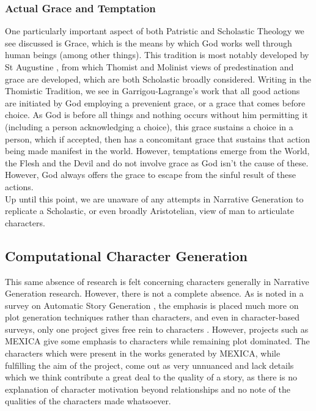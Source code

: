 \documentclass[11pt]{article}
\begin{document}
\subsubsection{Actual Grace and Temptation}
One particularly important aspect of both Patristic and Scholastic Theology we see discussed is Grace, which is the means by which God works well through human beings (among other things). This tradition is most notably developed by St Augustine \cite{hippo2014grace}, from which Thomist and Molinist views of predestination and grace are developed, which are both Scholastic broadly considered. Writing in the Thomistic Tradition, we see in Garrigou-Lagrange's work \cite{garrigou2013three} that all good actions are initiated by God employing a prevenient grace, or a grace that comes before choice. As God is before all things and nothing occurs without him permitting it (including a person acknowledging a choice), this grace sustains a choice in a person, which if accepted, then has a concomitant grace that sustains that action being made manifest in the world. However, temptations emerge from the World, the Flesh and the Devil and do not involve grace as God isn't the cause of these. However, God always offers the grace to escape from the sinful result of these actions.\\
Up until this point, we are unaware of any attempts in Narrative Generation to replicate a Scholastic, or even broadly Aristotelian, view of man to articulate characters.\\
\subsection{Computational Character Generation}
This same absence of research is felt concerning characters generally in Narrative Generation research. However, there is not a complete absence. As is noted in a survey on Automatic Story Generation \cite{AutomaticStoryGeneration2021}, the emphasis is placed much more on plot generation techniques rather than characters, and even in character-based surveys, only one project gives free rein to characters \cite{Riedl2003CharacterfocusedNP}. However, projects such as MEXICA\cite{MEXICA} give some emphasis to characters while remaining plot dominated. The characters which were present in the works generated by MEXICA, while fulfilling the aim of the project, come out as very unnuanced and lack details which we think contribute a great deal to the quality of a story, as there is no explanation of character motivation beyond relationships and no note of the qualities of the characters made whatsoever.\\
\end{document}
